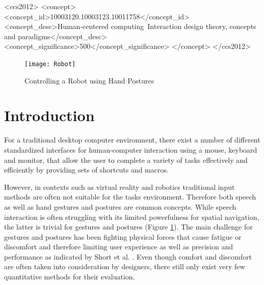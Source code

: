 \documentclass{sig-alternate-05-2015}
\begin{document}
%
%
\begin{CCSXML}
<ccs2012>
<concept>
<concept_id>10003120.10003123.10011758</concept_id>
<concept_desc>Human-centered computing~Interaction design theory, concepts and paradigms</concept_desc>
<concept_significance>500</concept_significance>
</concept>
</ccs2012>
\end{CCSXML}



\begin{figure}
\centering
\texttt{[image: Robot]}
\vspace{-20pt}
\caption{Controlling a Robot using Hand Postures}
\label{fig:Robot}
\vspace{-5pt}
\end{figure}

%
%

%
%
\printccsdesc



\section{Introduction}

For a traditional desktop computer environment, there exist a number of different standardized interfaces for human-computer interaction using a mouse, keyboard and monitor, that allow the user to 
complete a variety of tasks effectively and efficiently by providing sets of shortcuts and macros. 

However, in contexts such as virtual reality and robotics traditional input methods are often not suitable for the tasks environment. Therefore both speech as well as hand gestures and postures are common concepts. While speech interaction is often struggling with its limited powerfulness for spatial navigation, the latter is trivial for gestures and postures (Figure \ref{fig:Robot}). The main challenge for gestures and postures has been fighting physical forces that cause fatigue or discomfort and therefore limiting user experience as well as precision and performance as indicated by Short et al. \cite{short1999precision}. Even though comfort and discomfort are often taken into consideration by designers, there still only exist very few quantitative methods for their evaluation\cite{naddeo2015proposal}.
\end{document}
